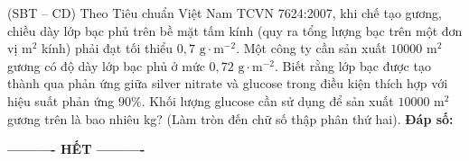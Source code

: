 \documentclass[12pt,a4paper]{article}
\begin{document}
\begin{ex}
(SBT -- CD) Theo Tiêu chuẩn Việt Nam TCVN 7624:2007, khi chế tạo gương, chiều dày lớp bạc phủ trên bề mặt tấm kính (quy ra tổng lượng bạc trên một đơn vị $\text{m}^2$ kính) phải đạt tối thiểu $0{,}7\text{ g}\cdot\text{m}^{-2}$. Một công ty cần sản xuất $10000\text{ m}^2$ gương có độ dày lớp bạc phủ ở mức $0{,}72\text{ g}\cdot\text{m}^{-2}$. Biết rằng lớp bạc được tạo thành qua phản ứng giữa silver nitrate và glucose trong điều kiện thích hợp với hiệu suất phản ứng $90\%$. Khối lượng glucose cần sử dụng để sản xuất $10000\text{ m}^2$ gương trên là bao nhiêu kg? (Làm tròn đến chữ số thập phân thứ hai).
\loigiai{}
\noindent\textbf{Đáp số:} \dotfill
\end{ex}


\begin{center}
	\textbf{---------- HẾT ----------}
\end{center}
\end{document}
